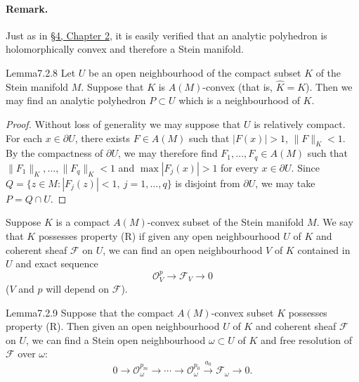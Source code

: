 \paragraph{Remark.} Just as in \hyperref[sec:2:4]{\S4, Chapter 2}, it is easily verified that an analytic polyhedron is holomorphically convex and therefore a Stein manifold.
\begin{originaltheorem}{Lemma}{7.2.8}
Let $U$ be an open neighbourhood of the compact subset $K$ of the Stein manifold $M$. Suppose that $K$ is $A(M)$-convex (that is, $\widehat K=K$). Then we may find an analytic polyhedron $P\subset U$ which is a neighbourhood of $K$.
\end{originaltheorem}
\begin{proof}
Without loss of generality we may suppose that $U$ is relatively compact. For each $x\in\partial U$, there exists $F\in A(M)$ such that $|F(x)|>1$, $\|F\|_K<1$. By the compactness of $\partial U$, we may therefore find $F_1,\ldots,F_q\in A(M)$ such that $\|F_1\|_K,\ldots,\|F_q\|_K<1$ and $\max|F_j(x)|>1$ for every $x\in\partial U$. Since $Q=\{z\in M:|F_j(z)|<1,\ j=1,\ldots,q\}$ is disjoint from $\partial U$, we may take $P=Q\cap U$.
\end{proof}
Suppose $K$ is a compact $A(M)$-convex subset of the Stein manifold $M$. We say that $K$ possesses property (R) if given any open neighbourhood $U$ of $K$ and coherent sheaf $\mathcal{F}$ on $U$, we can find an open neighbourhood $V$ of $K$ contained in $U$ and exact sequence
\[
\mathcal{O}_V^p\to\mathcal{F}_V\to0
\]
($V$ and $p$ will depend on $\mathcal{F}$).
\begin{originaltheorem}{Lemma}{7.2.9}
Suppose that the compact $A(M)$-convex subset $K$ possesses property (R). Then given an open neighbourhood $U$ of $K$ and coherent sheaf $\mathcal{F}$ on $U$, we can find a Stein open neighbourhood $\omega\subset U$ of $K$ and free resolution of $\mathcal{F}$ over $\omega$:
\[
0\to\mathcal{O}_\omega^{p_m}\to\cdots\to\mathcal{O}_\omega^{p_0}\xrightarrow{a_0}\mathcal{F}_\omega\to0.
\]
\end{originaltheorem}
